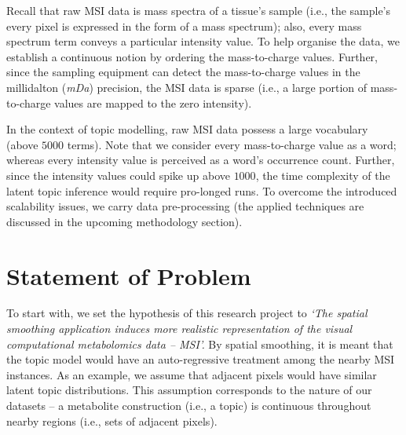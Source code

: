 \documentclass{mpaper}
\begin{document}
\par Recall that raw MSI data is mass spectra of a tissue's sample (i.e., the sample's every pixel is expressed in the form of a mass spectrum); also, every mass spectrum term conveys a particular intensity value. To help organise the data, we establish a continuous notion by ordering the mass-to-charge values. Further, since the sampling equipment can detect the mass-to-charge values in the millidalton (\textit{mDa}) precision, the MSI data is sparse (i.e., a large portion of mass-to-charge values are mapped to the zero intensity). 

\par In the context of topic modelling, raw MSI data possess a large vocabulary (above $5000$ terms). Note that we consider every mass-to-charge value as a word; whereas every intensity value is perceived as a word's occurrence count. Further, since the intensity values could spike up above $1000$, the time complexity of the latent topic inference would require pro-longed runs. To overcome the introduced scalability issues, we carry data pre-processing (the applied techniques are discussed in the upcoming methodology section).

\section{Statement of Problem}

\par To start with, we set the hypothesis of this research project to \textit{`The spatial smoothing application induces more realistic representation of the visual computational metabolomics data -- MSI'.} By spatial smoothing, it is meant that the topic model would have an auto-regressive treatment among the nearby MSI instances. As an example, we assume that adjacent pixels would have similar latent topic distributions. This assumption corresponds to the nature of our datasets -- a metabolite construction (i.e., a topic) is continuous throughout nearby regions (i.e., sets of adjacent pixels).
\end{document}

